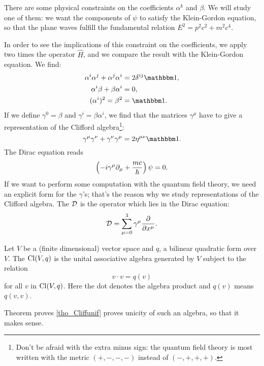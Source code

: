 There are some physical constraints on the coefficients $\alpha^k$ and $\beta$. We will study one of them: we want the components of $\psi$ to satisfy the Klein-Gordon equation, so that the plane waves fulfill the fundamental relation $E^2=p^2c^2+m^2c^4$.

In order to see the implications of this constraint on the coefficients, we apply two times the operator $\hat{H}$, and we compare the result with the Klein-Gordon equation. We find:
\begin{subequations}
\begin{align}
 \alpha^i\alpha^j+\alpha^j\alpha^i&=2\delta^{ij}\mtu,\\
 \alpha^i\beta+\beta\alpha^i&=0,\\
 (\alpha^i)^2=\beta^2&=\mtu.
\end{align}
\end{subequations}
%
If we define $\gamma^0=\beta$ and $\gamma^i=\beta\alpha^i$, we find that the matrices $\gamma^{\mu}$ have to give a representation of the Clifford algebra\footnote{Don't be afraid with the extra minus sign: the quantum field theory is most written with the metric $(+,-,-,-)$ instead of $(-,+,+,+)$.}:
\begin{equation}\label{cliffphys}
	\gamma\hmu\gamma\hnu+\gamma\hnu\gamma\hmu=2\eta^{\mu\nu}\mtu.
\end{equation}
The Dirac equation reads
\[
\left(-i\gamma^{\mu}\partial_{\mu}+\frac{mc}{\hbar}\right)\psi=0.
\]
If we want to perform some computation with the quantum field theory, we need an explicit form for the $\gamma$'s; that's the reason why we study representations of the Clifford algebra. The  $\mathcal{D}$ is the operator which lies in the Dirac equation:
\begin{equation}
 \label{dirflat}\mathcal{D}=\sum_{\mu=0}^3\gamma^{\mu}\frac{\partial }{\partial x^{\mu}}.
\end{equation}


\begin{definition}
Let $V$ be a (finite dimensional) vector space and $q$, a bilinear quadratic form over $V$. The  $\operatorname{Cl}(V,q)$ is the unital associative algebra generated by $V$ subject to the relation
\begin{equation}\label{501r1}
       v\cdot v=q(v)
\end{equation}
for all $v$ in $\operatorname{Cl}(V,q)$. Here the dot denotes the algebra product and $q(v)$ means $q(v,v)$.
\end{definition}
Theorem proves \ref{tho_Cliffunif} proves unicity of such an algebra, so that it makes sense.

